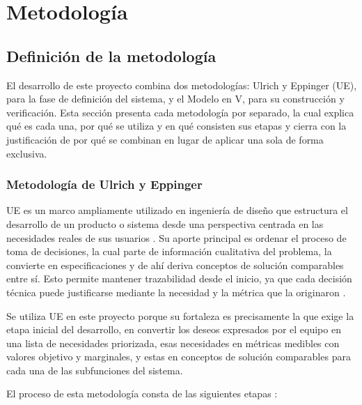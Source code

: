 \chapter{Metodología}
\label{cap:metodologia}

\section{Definición de la metodología}

El desarrollo de este proyecto combina dos metodologías: Ulrich y Eppinger (UE), para la 
fase de definición del sistema, y el Modelo en V, para su construcción y verificación. Esta 
sección presenta cada metodología por separado, la cual explica qué es cada una, por qué se 
utiliza y en qué consisten sus etapas y cierra con la justificación de por qué se combinan en lugar 
de aplicar una sola de forma exclusiva.

\subsection{Metodología de Ulrich y Eppinger}

UE es un marco ampliamente utilizado en ingeniería de diseño que estructura el desarrollo de un 
producto o sistema desde una perspectiva centrada en las necesidades reales de sus usuarios \cite{Cite11}. 
Su aporte principal es ordenar el proceso de toma de decisiones, la cual parte de información 
cualitativa del problema, la convierte en especificaciones y de ahí deriva conceptos de solución 
comparables entre sí. Esto permite mantener trazabilidad desde el inicio, ya que cada decisión 
técnica puede justificarse mediante la necesidad y la métrica que la originaron \cite{Cite11}.

Se utiliza UE en este proyecto porque su fortaleza es precisamente la que exige la etapa inicial 
del desarrollo, en convertir los deseos expresados por el equipo en una lista de necesidades 
priorizada, esas necesidades en métricas medibles con valores objetivo y marginales, y estas
en conceptos de solución comparables para cada una de las subfunciones del sistema.


\newpage

El proceso de esta metodología consta de las siguientes etapas \cite{Cite11}:

